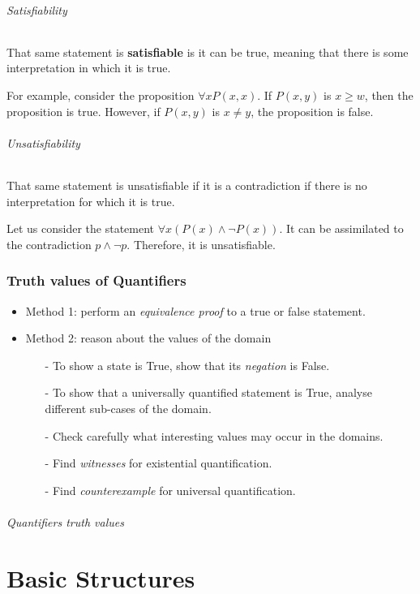 \documentclass[10pt,a4paper]{book}
\begin{document}
\paragraph*{Satisfiability}
That same statement is \textbf{satisfiable} is it can be true, meaning that there is some interpretation in which it is true.\par 
For example, consider the proposition $\forall x P(x,x)$. If $P(x,y)$ is $x\geq w$, then the proposition is true. However, if $P(x,y)$ is $x\neq y$, the proposition is false.
\paragraph*{Unsatisfiability}
That same statement is unsatisfiable if it is a contradiction if there is no interpretation for which it is true.\par 
Let us consider the statement $\forall x (P(x)\land\neg P(x))$. It can be assimilated to the contradiction $p\land\neg p$. Therefore, it is unsatisfiable.
\section{Truth values of Quantifiers}
\begin{itemize}
\item Method 1: perform an \textit{equivalence proof} to a true or false statement.
\item Method 2: reason about the values of the domain
\begin{itemize}[noitemsep]
	\item[-]To show a state is True, show that its \textit{negation} is False.
	\item[-]To show that a universally quantified statement is True, analyse different sub-cases of the domain.
	\item[-]Check carefully what interesting values may occur in the domains.
	\item[-]Find \textit{witnesses} for existential quantification.
	\item[-]Find \textit{counterexample} for universal quantification.
\end{itemize}
\end{itemize}
\paragraph*{Quantifiers truth values}

\part{Basic Structures}
\end{document}

